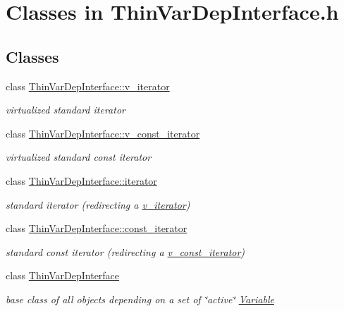 \hypertarget{group___thin_var_dep_interface___c_l_a_s_s_e_s}{}\section{Classes in Thin\+Var\+Dep\+Interface.\+h}
\label{group___thin_var_dep_interface___c_l_a_s_s_e_s}
\subsection*{Classes}
\begin{DoxyCompactItemize}
\item 
class \mbox{\hyperlink{class_s_m_spp__di__unipi__it_1_1_thin_var_dep_interface_1_1v__iterator}{Thin\+Var\+Dep\+Interface\+::v\+\_\+iterator}}
\begin{DoxyCompactList}\small\item\em virtualized standard iterator \end{DoxyCompactList}\item 
class \mbox{\hyperlink{class_s_m_spp__di__unipi__it_1_1_thin_var_dep_interface_1_1v__const__iterator}{Thin\+Var\+Dep\+Interface\+::v\+\_\+const\+\_\+iterator}}
\begin{DoxyCompactList}\small\item\em virtualized standard const iterator \end{DoxyCompactList}\item 
class \mbox{\hyperlink{class_s_m_spp__di__unipi__it_1_1_thin_var_dep_interface_1_1iterator}{Thin\+Var\+Dep\+Interface\+::iterator}}
\begin{DoxyCompactList}\small\item\em standard iterator (redirecting a \mbox{\hyperlink{class_s_m_spp__di__unipi__it_1_1_thin_var_dep_interface_1_1v__iterator}{v\+\_\+iterator}}) \end{DoxyCompactList}\item 
class \mbox{\hyperlink{class_s_m_spp__di__unipi__it_1_1_thin_var_dep_interface_1_1const__iterator}{Thin\+Var\+Dep\+Interface\+::const\+\_\+iterator}}
\begin{DoxyCompactList}\small\item\em standard const iterator (redirecting a \mbox{\hyperlink{class_s_m_spp__di__unipi__it_1_1_thin_var_dep_interface_1_1v__const__iterator}{v\+\_\+const\+\_\+iterator}}) \end{DoxyCompactList}\item 
class \mbox{\hyperlink{class_s_m_spp__di__unipi__it_1_1_thin_var_dep_interface}{Thin\+Var\+Dep\+Interface}}
\begin{DoxyCompactList}\small\item\em base class of all objects depending on a set of \char`\"{}active\char`\"{} \mbox{\hyperlink{class_s_m_spp__di__unipi__it_1_1_variable}{Variable}} \end{DoxyCompactList}\end{DoxyCompactItemize}
